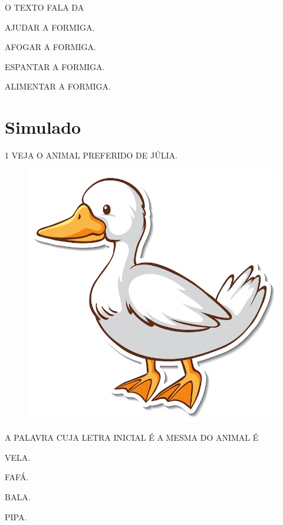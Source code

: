 O TEXTO FALA DA

\begin{escolha}

\item AJUDAR A FORMIGA.

\item AFOGAR A FORMIGA.

\item ESPANTAR A FORMIGA.

\item ALIMENTAR A FORMIGA.

\end{escolha}

\chapter[Simulado 4]{Simulado}

\num{1} VEJA O ANIMAL PREFERIDO DE JÚLIA.

\begin{figure}[H]
\centering
\includegraphics[width=.6\textwidth]{./media/image238.png}
\end{figure}

A PALAVRA CUJA LETRA INICIAL É A MESMA DO ANIMAL É

\begin{escolha}

\item VELA.

\item FAFÁ.

\item BALA.

\item PIPA.

\end{escolha}

